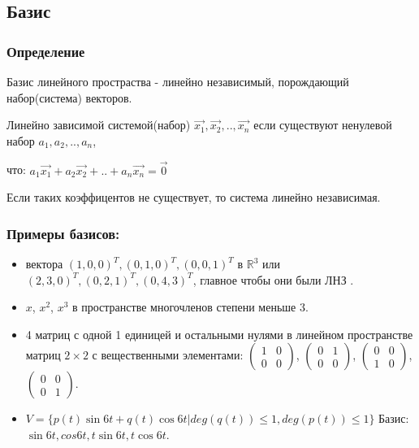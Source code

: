 \documentclass[12pt]{article}
\begin{document}
\subsection{Базис}
\subsubsection{Определение}
Базис линейного простраства - линейно независимый, порождающий набор(система) векторов.\par
Линейно зависимой системой(набор) $\overrightarrow{x_1},\overrightarrow{ x_2},..,\overrightarrow{x_n}$ если существуют ненулевой набор $a_1,a_2,..,a_n$,\par что: $a_1\overrightarrow{x_1}+a_2\overrightarrow{ x_2}+..+a_n\overrightarrow{x_n}=\overrightarrow{0}$ \par Если таких коэффицентов не существует, то система линейно независимая.\\
\subsubsection{Примеры базисов:}
\begin{itemize}
    \item вектора $(1,0,0)^T,(0,1,0)^T,(0,0,1)^T$ в $\mathbb{R}^3$ или $(2,3,0)^T,(0,2,1)^T,(0,4,3)^T$, главное чтобы они были ЛНЗ .
    \item $x$, $x^2$, $x^3$ в пространстве многочленов степени меньше 3.
    \item 4 матриц с одной 1 единицей и остальными нулями в линейном пространстве матриц $2 \times 2$ с вещественными элементами:
          $\begin{pmatrix}
                  1 & 0 \\
                  0 & 0
              \end{pmatrix}$,
          $\begin{pmatrix}
                  0 & 1 \\
                  0 & 0
              \end{pmatrix}$,
          $\begin{pmatrix}
                  0 & 0 \\
                  1 & 0
              \end{pmatrix}$,
          $\begin{pmatrix}
                  0 & 0 \\
                  0 & 1
              \end{pmatrix}$.
    \item $V =\{p(t)\sin{6t}+q(t)\cos{6t} \vert deg(q(t))\leq 1, deg(p(t))\leq 1\}$ Базис: $\sin{6t},cos{6t},t\sin{6t},t\cos{6t}$.
\end{itemize}
\end{document}
